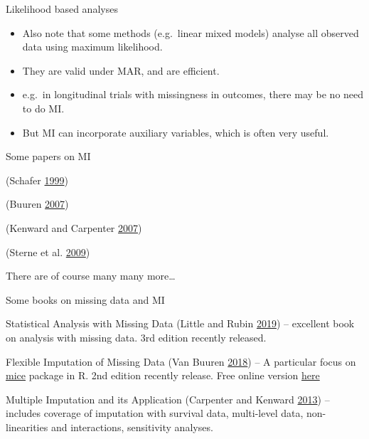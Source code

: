\documentclass[ignorenonframetext,]{beamer}
\providecommand{\tightlist}{%
  \setlength{\itemsep}{0pt}\setlength{\parskip}{0pt}}
\begin{document}
\begin{frame}{Likelihood based analyses}
\protect\hypertarget{likelihood-based-analyses}{}

\begin{itemize}
\tightlist
\item
  Also note that some methods (e.g.~linear mixed models) analyse all
  observed data using maximum likelihood.
\item
  They are valid under MAR, and are efficient.
\item
  e.g.~in longitudinal trials with missingness in outcomes, there may be
  no need to do MI.
\item
  But MI can incorporate auxiliary variables, which is often very
  useful.
\end{itemize}

\end{frame}

\begin{frame}{Some papers on MI}
\protect\hypertarget{some-papers-on-mi}{}

(Schafer \protect\hyperlink{ref-Schafer:1999}{1999})

(Buuren \protect\hyperlink{ref-Buuren:2007}{2007})

(Kenward and Carpenter
\protect\hyperlink{ref-Kenwardux2fCarpenter:2007}{2007})

(Sterne et al.
\protect\hyperlink{ref-Sterneux2fWhiteux2fCarlin:2009}{2009})

There are of course many many more\ldots{}

\end{frame}

\begin{frame}{Some books on missing data and MI}
\protect\hypertarget{some-books-on-missing-data-and-mi}{}

Statistical Analysis with Missing Data (Little and Rubin
\protect\hyperlink{ref-little2019statistical}{2019}) -- excellent book
on analysis with missing data. 3rd edition recently released.

Flexible Imputation of Missing Data (Van Buuren
\protect\hyperlink{ref-van2018flexible}{2018}) -- A particular focus on
\href{https://cran.r-project.org/web/packages/mice/index.html}{mice}
package in R. 2nd edition recently release. Free online version
\href{https://stefvanbuuren.name/fimd/}{here}

Multiple Imputation and its Application (Carpenter and Kenward
\protect\hyperlink{ref-CarpenterKenward2013}{2013}) -- includes coverage
of imputation with survival data, multi-level data, non-linearities and
interactions, sensitivity analyses.

\end{frame}
\end{document}
